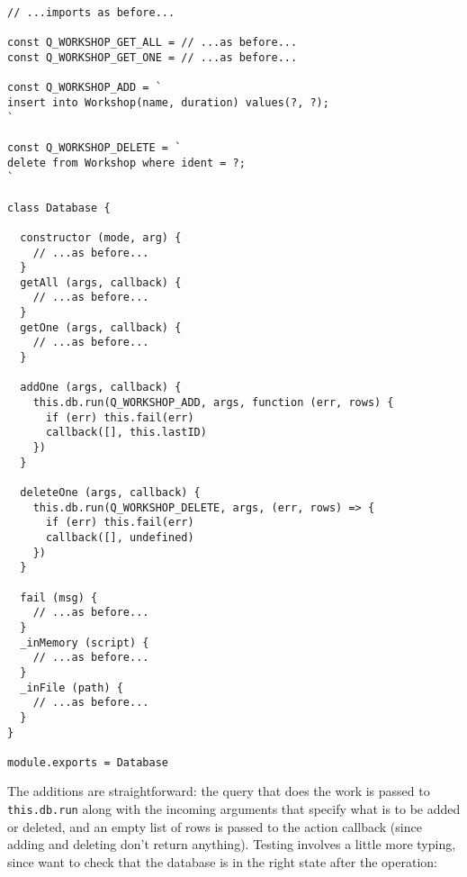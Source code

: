 \begin{verbatim}
// ...imports as before...

const Q_WORKSHOP_GET_ALL = // ...as before...
const Q_WORKSHOP_GET_ONE = // ...as before...

const Q_WORKSHOP_ADD = `
insert into Workshop(name, duration) values(?, ?);
`

const Q_WORKSHOP_DELETE = `
delete from Workshop where ident = ?;
`

class Database {

  constructor (mode, arg) {
    // ...as before...
  }
  getAll (args, callback) {
    // ...as before...
  }
  getOne (args, callback) {
    // ...as before...
  }

  addOne (args, callback) {
    this.db.run(Q_WORKSHOP_ADD, args, function (err, rows) {
      if (err) this.fail(err)
      callback([], this.lastID)
    })
  }

  deleteOne (args, callback) {
    this.db.run(Q_WORKSHOP_DELETE, args, (err, rows) => {
      if (err) this.fail(err)
      callback([], undefined)
    })
  }

  fail (msg) {
    // ...as before...
  }
  _inMemory (script) {
    // ...as before...
  }
  _inFile (path) {
    // ...as before...
  }
}

module.exports = Database
\end{verbatim}

The additions are straightforward:
the query that does the work is passed to \texttt{this.db.run} along with the incoming arguments
that specify what is to be added or deleted,
and an empty list of rows is passed to the action callback
(since adding and deleting don't return anything).
Testing involves a little more typing,
since want to check that the database is in the right state after the operation:

